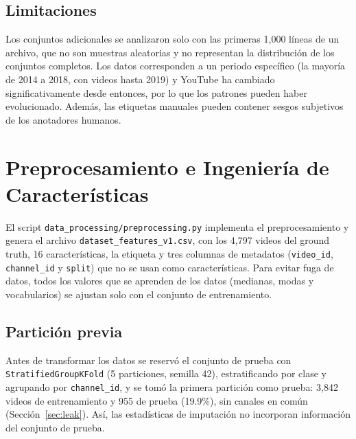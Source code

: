 \documentclass[conference]{IEEEtran}
\begin{document}
\subsection{Limitaciones}\label{sec:limit1}
Los conjuntos adicionales se analizaron solo con las primeras 1,000 líneas de un archivo, que no son muestras aleatorias y no representan la distribución de los conjuntos completos. Los datos corresponden a un periodo específico (la mayoría de 2014 a 2018, con videos hasta 2019) y YouTube ha cambiado significativamente desde entonces, por lo que los patrones pueden haber evolucionado. Además, las etiquetas manuales pueden contener sesgos subjetivos de los anotadores humanos.

\section{Preprocesamiento e Ingeniería de Características}\label{sec:prep}
El script \texttt{data\_processing/preprocessing.py} implementa el preprocesamiento y genera el archivo \texttt{dataset\_features\_v1.csv}, con los 4,797 videos del ground truth, 16 características, la etiqueta y tres columnas de metadatos (\texttt{video\_id}, \texttt{channel\_id} y \texttt{split}) que no se usan como características. Para evitar fuga de datos, todos los valores que se aprenden de los datos (medianas, modas y vocabularios) se ajustan solo con el conjunto de entrenamiento.

\subsection{Partición previa}
Antes de transformar los datos se reservó el conjunto de prueba con \texttt{StratifiedGroupKFold} (5 particiones, semilla 42), estratificando por clase y agrupando por \texttt{channel\_id}, y se tomó la primera partición como prueba: 3,842 videos de entrenamiento y 955 de prueba (19.9\%), sin canales en común (Sección~\ref{sec:leak}). Así, las estadísticas de imputación no incorporan información del conjunto de prueba.
\end{document}
